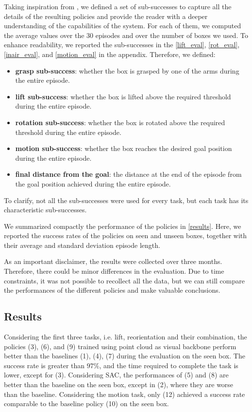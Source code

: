 \documentclass[letterpaper, 10 pt, conference]{ieeeconf}  %
\begin{document}
Taking inspiration from \cite{kressgazit2024robotlearningempiricalscience}, we defined a set of sub-successes to capture all the details of the resulting policies and provide the reader with a deeper understanding of the capabilities of the system. 
For each of them, we computed the average values over the 30 episodes and over the number of boxes we used.
To enhance readability, we reported the sub-successes in the \cref{lift_eval}, \cref{rot_eval}, \cref{inair_eval}, and \cref{motion_eval} in the appendix.
Therefore, we defined:
\begin{itemize}
    \item \textbf{grasp sub-success}: whether the box is grasped by one of the arms during the entire episode.
    \item \textbf{lift sub-success}: whether the box is lifted above the required threshold during the entire episode.
    \item \textbf{rotation sub-success}: whether the box is rotated above the required threshold during the entire episode.
    \item \textbf{motion sub-success}: whether the box reaches the desired goal position during the entire episode.
    \item \textbf{final distance from the goal}: the distance at the end of the episode from the goal position achieved during the entire episode.
\end{itemize}

To clarify, not all the sub-successes were used for every task, but each task has its characteristic sub-successes.

We summarized compactly the performance of the policies in \cref{results}. Here, we reported the success rates of the policies on seen and unseen boxes, together with their average and standard deviation episode length.

As an important disclaimer, the results were collected over three months. Therefore, there could be minor differences in the evaluation.
Due to time constraints, it was not possible to recollect all the data, but we can still compare the performances of the different policies and make valuable conclusions.

\subsection{Results}\label{section-results}

Considering the first three tasks, i.e. lift, reorientation and their combination, the policies (3), (6), and (9) trained using point cloud as visual backbone perform better than the baselines (1), (4), (7) during the evaluation on the seen box. The success rate is greater than $97\%$, and the time required to complete the task is lower, except for (3). Considering SAC, the performances of (5) and (8) are better than the baseline on the seen box, except in (2), where they are worse than the baseline. 
Considering the motion task, only (12) achieved a success rate comparable to the baseline policy (10) on the seen box.
\end{document}
